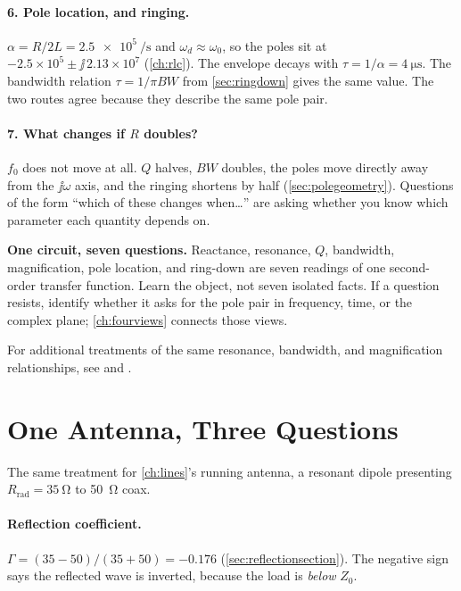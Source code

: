 \paragraph{6. Pole location, and ringing.}
\(\alpha=R/2L=\SI{2.5e5}{\per\second}\) and \(\omega_d\approx\omega_0\), so the poles
sit at \(-2.5\times10^5\pm\jj\,2.13\times10^7\) (\cref{ch:rlc}). The envelope decays
with \(\tau=1/\alpha=\SI{4}{\micro\second}\). The bandwidth relation
\(\tau=1/\pi BW\) from \cref{sec:ringdown} gives the same value. The two routes
agree because they describe the same pole pair.

\paragraph{7. What changes if \(R\) doubles?}
\(f_0\) does not move at all. \(Q\) halves, \(BW\) doubles, the poles move directly
away from the \(\jj\omega\) axis, and the ringing shortens by half
(\cref{sec:polegeometry}). Questions of the form ``which of these changes when\dots''
are asking whether you know which parameter each quantity depends on.

\begin{controlsbox}
\textbf{One circuit, seven questions.} Reactance, resonance, \(Q\), bandwidth,
magnification, pole location, and ring-down are seven readings of one second-order
transfer function. Learn the object, not seven isolated facts. If a question resists,
identify whether it asks for the pole pair in frequency, time, or the complex plane;
\cref{ch:fourviews} connects those views.
\end{controlsbox}
For additional treatments of the same resonance, bandwidth, and magnification
relationships, see \cite[pp.~59--67]{white2004highfrequency} and
\cite[pp.~23--35]{bowick2008rfcircuit}.

\section{One Antenna, Three Questions}
\label{sec:oneantenna}
The same treatment for \cref{ch:lines}'s running antenna, a resonant dipole presenting
\(R_{\text{rad}}=\SI{35}{\ohm}\) to \SI{50}{\ohm} coax.

\paragraph{Reflection coefficient.}
\(\Gamma=(35-50)/(35+50)=-0.176\) (\cref{sec:reflectionsection}). The negative sign
says the reflected wave is inverted, because the load is \emph{below} \(Z_0\).

